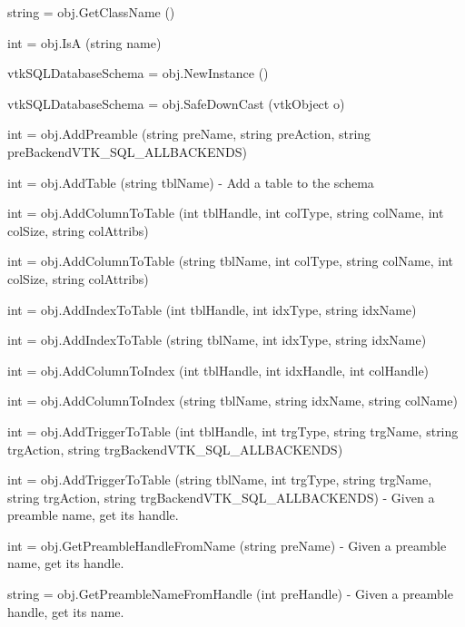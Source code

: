 \begin{DoxyItemize}
\item {\ttfamily string = obj.\-Get\-Class\-Name ()}  
\item {\ttfamily int = obj.\-Is\-A (string name)}  
\item {\ttfamily vtk\-S\-Q\-L\-Database\-Schema = obj.\-New\-Instance ()}  
\item {\ttfamily vtk\-S\-Q\-L\-Database\-Schema = obj.\-Safe\-Down\-Cast (vtk\-Object o)}  
\item {\ttfamily int = obj.\-Add\-Preamble (string pre\-Name, string pre\-Action, string pre\-Backend\-V\-T\-K\-\_\-\-S\-Q\-L\-\_\-\-A\-L\-L\-B\-A\-C\-K\-E\-N\-D\-S)}  
\item {\ttfamily int = obj.\-Add\-Table (string tbl\-Name)} -\/ Add a table to the schema  
\item {\ttfamily int = obj.\-Add\-Column\-To\-Table (int tbl\-Handle, int col\-Type, string col\-Name, int col\-Size, string col\-Attribs)}  
\item {\ttfamily int = obj.\-Add\-Column\-To\-Table (string tbl\-Name, int col\-Type, string col\-Name, int col\-Size, string col\-Attribs)}  
\item {\ttfamily int = obj.\-Add\-Index\-To\-Table (int tbl\-Handle, int idx\-Type, string idx\-Name)}  
\item {\ttfamily int = obj.\-Add\-Index\-To\-Table (string tbl\-Name, int idx\-Type, string idx\-Name)}  
\item {\ttfamily int = obj.\-Add\-Column\-To\-Index (int tbl\-Handle, int idx\-Handle, int col\-Handle)}  
\item {\ttfamily int = obj.\-Add\-Column\-To\-Index (string tbl\-Name, string idx\-Name, string col\-Name)}  
\item {\ttfamily int = obj.\-Add\-Trigger\-To\-Table (int tbl\-Handle, int trg\-Type, string trg\-Name, string trg\-Action, string trg\-Backend\-V\-T\-K\-\_\-\-S\-Q\-L\-\_\-\-A\-L\-L\-B\-A\-C\-K\-E\-N\-D\-S)}  
\item {\ttfamily int = obj.\-Add\-Trigger\-To\-Table (string tbl\-Name, int trg\-Type, string trg\-Name, string trg\-Action, string trg\-Backend\-V\-T\-K\-\_\-\-S\-Q\-L\-\_\-\-A\-L\-L\-B\-A\-C\-K\-E\-N\-D\-S)} -\/ Given a preamble name, get its handle.  
\item {\ttfamily int = obj.\-Get\-Preamble\-Handle\-From\-Name (string pre\-Name)} -\/ Given a preamble name, get its handle.  
\item {\ttfamily string = obj.\-Get\-Preamble\-Name\-From\-Handle (int pre\-Handle)} -\/ Given a preamble handle, get its name.  

\end{DoxyItemize}
